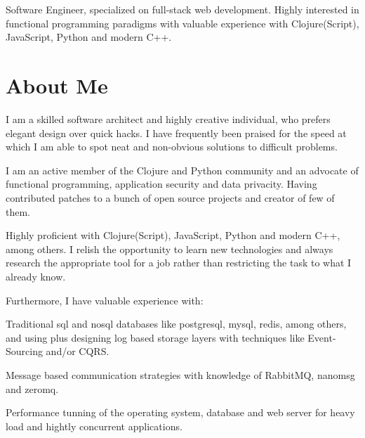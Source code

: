 \documentclass[letterpaper]{cv} %
\begin{document}

\justifying

\section{}

Software Engineer, specialized on full-stack web development. Highly
interested in functional programming paradigms with valuable experience
with Clojure(Script), JavaScript, Python and modern C++.

\sectionspace
\sectionspace

\section{About Me}
\sectionspace

I am a skilled software architect and highly creative individual, who prefers
elegant design over quick hacks. I have frequently been praised for the speed
at which I am able to spot neat and non-obvious solutions to difficult
problems.\newline

I am an active member of the Clojure and Python community and an advocate of
functional programming, application security and data privacity. Having
contributed patches to a bunch of open source projects and creator of few
of them.\newline

Highly proficient with Clojure(Script), JavaScript, Python and modern C++,
among others. I relish the opportunity to learn new technologies and
always research the appropriate tool for a job rather than restricting
the task to what I already know.\newline

Furthermore, I have valuable experience with:

\begin{tightitemize}
\item Traditional sql and nosql databases like postgresql, mysql, redis, among others, and using plus designing log based storage layers with techniques like Event-Sourcing and/or CQRS.
\item Message based communication strategies with knowledge of RabbitMQ, nanomsg and zeromq.
\item Performance tunning of the operating system, database and web server for heavy load and hightly concurrent applications.
\end{tightitemize}
\end{document}
